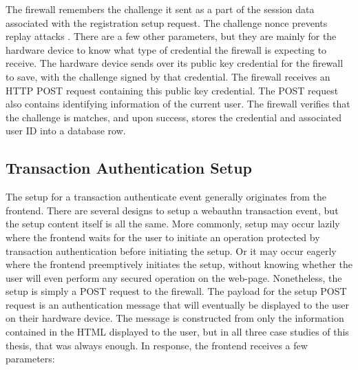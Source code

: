 

The firewall remembers the challenge it sent as a part of the session data associated with the registration setup request. The challenge nonce prevents replay attacks \cite{TODO-replay-attack}. There are a few other parameters, but they are mainly for the hardware device to know what type of credential the firewall is expecting to receive. The hardware device sends over its public key credential for the firewall to save, with the challenge signed by that credential. The firewall receives an HTTP POST request containing this public key credential. The POST request also contains identifying information of the current user. The firewall verifies that the challenge is matches, and upon success, stores the credential and associated user ID into a database row.

\subsection{Transaction Authentication Setup}\label{Sec:TransactionAuthenticationSetup}


The setup for a transaction authenticate event generally originates from the frontend. There are several designs to setup a webauthn transaction event, but the setup content itself is all the same. More commonly, setup may occur lazily where the frontend waits for the user to initiate an operation protected by transaction authentication before initiating the setup. Or it may occur eagerly where the frontend preemptively initiates the setup, without knowing whether the user will even perform any secured operation on the web-page. Nonetheless, the setup is simply a POST request to the firewall. The payload for the setup POST request is an authentication message that will eventually be displayed to the user on their hardware device. The message is constructed from only the information contained in the HTML displayed to the user, but in all three case studies of this thesis, that was always enough. In response, the frontend receives a few parameters:

